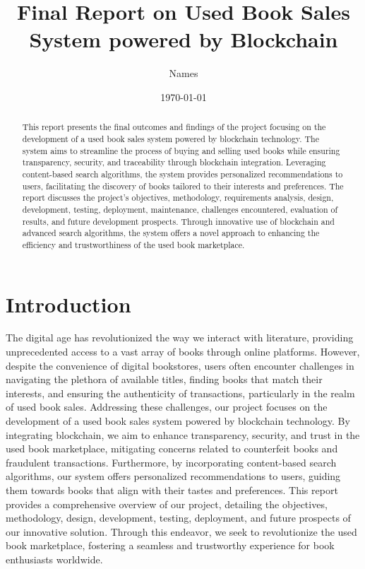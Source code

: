 \documentclass{article}
\title{Final Report on Used Book Sales System powered by Blockchain}
\author{Names}
\date{\today}
\begin{document}
\maketitle

\begin{abstract}
This report presents the final outcomes and findings of the project focusing on the development of a used book sales system powered by blockchain technology. The system aims to streamline the process of buying and selling used books while ensuring transparency, security, and traceability through blockchain integration. Leveraging content-based search algorithms, the system provides personalized recommendations to users, facilitating the discovery of books tailored to their interests and preferences. The report discusses the project's objectives, methodology, requirements analysis, design, development, testing, deployment, maintenance, challenges encountered, evaluation of results, and future development prospects. Through innovative use of blockchain and advanced search algorithms, the system offers a novel approach to enhancing the efficiency and trustworthiness of the used book marketplace.
\end{abstract}

\section{Introduction}
The digital age has revolutionized the way we interact with literature, providing unprecedented access to a vast array of books through online platforms. However, despite the convenience of digital bookstores, users often encounter challenges in navigating the plethora of available titles, finding books that match their interests, and ensuring the authenticity of transactions, particularly in the realm of used book sales. Addressing these challenges, our project focuses on the development of a used book sales system powered by blockchain technology. By integrating blockchain, we aim to enhance transparency, security, and trust in the used book marketplace, mitigating concerns related to counterfeit books and fraudulent transactions. Furthermore, by incorporating content-based search algorithms, our system offers personalized recommendations to users, guiding them towards books that align with their tastes and preferences. This report provides a comprehensive overview of our project, detailing the objectives, methodology, design, development, testing, deployment, and future prospects of our innovative solution. Through this endeavor, we seek to revolutionize the used book marketplace, fostering a seamless and trustworthy experience for book enthusiasts worldwide.
\end{document}
